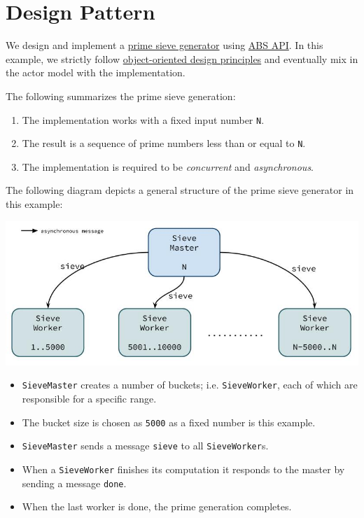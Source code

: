 
\chapter{Design Pattern}
\label{ch:p02:ch02}

We design and implement a
\href{http://en.wikipedia.org/wiki/Sieve_of_Eratosthenes}{prime sieve
generator} using \href{https://github.com/CrispOSS/abs-api-parent}{ABS
API}. In this example, we strictly follow
\href{http://en.wikipedia.org/wiki/Object-oriented_programming}{object-oriented
design principles} and eventually mix in the actor model with the
implementation.

The following summarizes the prime sieve generation:

\begin{enumerate}
\itemsep1pt\parskip0pt
\item
  The implementation works with a fixed input number \lstinline!N!.\\
\item
  The result is a sequence of prime numbers less than or equal to
  \lstinline!N!.\\
\item
  The implementation is required to be \emph{concurrent} and
  \emph{asynchronous}.
\end{enumerate}

The following diagram depicts a general structure of the prime sieve
generator in this example:

\includegraphics{figs/PrimeSieves.jpg}

\begin{itemize}
\itemsep1pt\parskip0pt
\item
  \lstinline!SieveMaster! creates a number of buckets; i.e.
  \lstinline!SieveWorker!, each of which are responsible for a specific
  range.\\
\item
  The bucket size is chosen as \lstinline!5000! as a fixed number is
  this example.\\
\item
  \lstinline!SieveMaster! sends a message \lstinline!sieve! to all
  \lstinline!SieveWorker!s.\\
\item
  When a \lstinline!SieveWorker! finishes its computation it responds to
  the master by sending a message \lstinline!done!.\\
\item
  When the last worker is done, the prime generation completes.
\end{itemize}

